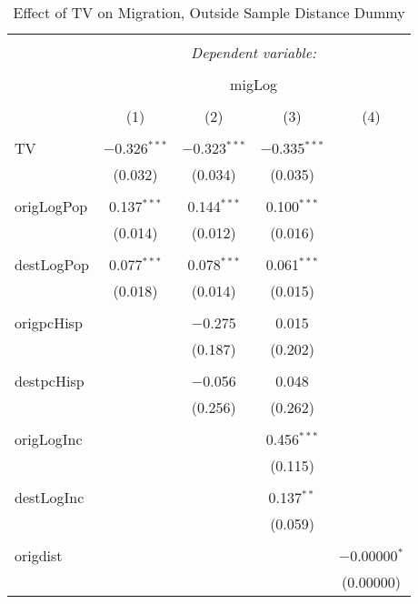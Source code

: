 
\begin{table}[!htbp] \centering 
  \caption{Effect of TV on Migration, Outside Sample Distance Dummy} 
  \label{} 
\begin{tabular}{@{\extracolsep{5pt}}lcccc} 
\\[-1.8ex]\hline 
\hline \\[-1.8ex] 
 & \multicolumn{4}{c}{\textit{Dependent variable:}} \\ 
\cline{2-5} 
\\[-1.8ex] & \multicolumn{4}{c}{migLog} \\ 
\\[-1.8ex] & (1) & (2) & (3) & (4)\\ 
\hline \\[-1.8ex] 
 TV & $-$0.326$^{***}$ & $-$0.323$^{***}$ & $-$0.335$^{***}$ &  \\ 
  & (0.032) & (0.034) & (0.035) &  \\ 
  & & & & \\ 
 origLogPop & 0.137$^{***}$ & 0.144$^{***}$ & 0.100$^{***}$ &  \\ 
  & (0.014) & (0.012) & (0.016) &  \\ 
  & & & & \\ 
 destLogPop & 0.077$^{***}$ & 0.078$^{***}$ & 0.061$^{***}$ &  \\ 
  & (0.018) & (0.014) & (0.015) &  \\ 
  & & & & \\ 
 origpcHisp &  & $-$0.275 & 0.015 &  \\ 
  &  & (0.187) & (0.202) &  \\ 
  & & & & \\ 
 destpcHisp &  & $-$0.056 & 0.048 &  \\ 
  &  & (0.256) & (0.262) &  \\ 
  & & & & \\ 
 origLogInc &  &  & 0.456$^{***}$ &  \\ 
  &  &  & (0.115) &  \\ 
  & & & & \\ 
 destLogInc &  &  & 0.137$^{**}$ &  \\ 
  &  &  & (0.059) &  \\ 
  & & & & \\ 
 origdist &  &  &  & $-$0.00000$^{*}$ \\ 
  &  &  &  & (0.00000) \\ 

\end{tabular}
\end{table}
